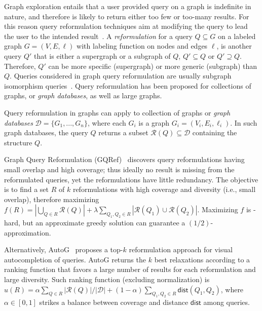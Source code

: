 


\noindent Graph exploration entails that a user provided query on a graph is indefinite in nature, and therefore is likely to return either too few or too-many results. 
For this reason query reformulation techniques aim at modifying the query to lead the user to the intended result~\citep{mottin2015graph,hurtado2008query,islam2015efficient}. 
A \emph{reformulation} for a query $Q \subseteq G$ on a labeled graph $G = (V, E, \ell)$ with labeling function on nodes and edges $\ell$, is another query $Q'$ that is either a supergraph or a subgraph of $Q$, $Q' \subseteq Q$ or $Q' \supseteq Q$. Therefore, $Q'$ can be more specific (supergraph) or more generic (subgraph) than $Q$. 
Queries considered in graph query reformulation are usually subgraph isomorphism queries~\cite{lee2012depth}.  
Query reformulation has been proposed for collections of graphs, or \emph{graph databases}, as well as large graphs. 

Query reformulation in graphs can apply to collection of graphs or \emph{graph databases} $\mathcal{D} = \{G_1, ..., G_n\}$, where each $G_i$ is a graph $G_i = (V_i, E_i, \ell_i)$. 
In such graph databases, the query $Q$ returns a subset $\mathcal{R}(Q) \subseteq \mathcal{D}$ containing the structure $Q$. 

Graph Query Reformulation (GQRef)~\citep{mottin2015graph} discovers query reformulations having small overlap and high coverage; thus ideally no result is missing from the reformulated queries, yet the reformulations have little redundancy. 
The objective is to find a set $R$ of $k$ reformulations with high coverage and diversity (i.e., small overlap), therefore maximizing $f(R) = |\bigcup_{Q \in R}\mathcal{R}(Q)|+ \lambda\sum_{Q_1,Q_2 \in R}|\mathcal{R}(Q_1) \cup \mathcal{R}(Q_2)|$. 
Maximizing $f$ is \NP-hard, but an approximate greedy solution can guarantee a $(1/2)$-approximation. 

Alternatively, AutoG~\citep{yi2017autog} proposes a top-$k$ reformulation approach for visual autocompletion of queries. 
AutoG returns the $k$ best relaxations according to a ranking function that favors a large number of results for each reformulation and large diversity. 
Such ranking function (excluding normalization) is $u(R) = \alpha \sum_{Q \in R}|\mathcal{R}(Q)|/|\mathcal{D}| + (1-\alpha) \sum_{Q_1, Q_2 \in R} \mathsf{dist}(Q_1, Q_2)$, where  $\alpha \in [0,1]$ strikes a balance between coverage and distance $\mathsf{dist}$ among queries.



